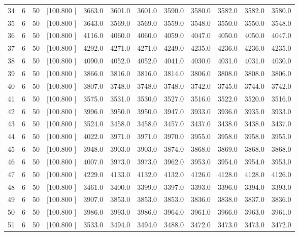 \documentclass[12pt,a4paper]{article}
\begin{document}
\begin{center}
{\begin{tabular}{r r r r r r r r r r r r}
  34&  6& 50&[100.800   ]&  3663.0&  3601.0&  3601.0&  3590.0&  3580.0&  3582.0&  3582.0&  3580.0\\[-0.02in]
  35&  6& 50&[100.800   ]&  3643.0&  3569.0&  3569.0&  3559.0&  3548.0&  3550.0&  3550.0&  3548.0\\[-0.02in]
  36&  6& 50&[100.800   ]&  4116.0&  4060.0&  4060.0&  4059.0&  4047.0&  4050.0&  4050.0&  4047.0\\[-0.02in]
  37&  6& 50&[100.800   ]&  4292.0&  4271.0&  4271.0&  4249.0&  4235.0&  4236.0&  4236.0&  4235.0\\[-0.02in]
  38&  6& 50&[100.800   ]&  4090.0&  4052.0&  4052.0&  4041.0&  4030.0&  4031.0&  4031.0&  4030.0\\[-0.02in]
  39&  6& 50&[100.800   ]&  3866.0&  3816.0&  3816.0&  3814.0&  3806.0&  3808.0&  3808.0&  3806.0\\[-0.02in]
  40&  6& 50&[100.800   ]&  3807.0&  3748.0&  3748.0&  3748.0&  3742.0&  3745.0&  3744.0&  3742.0\\[-0.02in]
  41&  6& 50&[100.800   ]&  3575.0&  3531.0&  3530.0&  3527.0&  3516.0&  3522.0&  3520.0&  3516.0\\[-0.02in]
  42&  6& 50&[100.800   ]&  3996.0&  3950.0&  3950.0&  3947.0&  3933.0&  3936.0&  3935.0&  3933.0\\[-0.02in]
  43&  6& 50&[100.800   ]&  3524.0&  3458.0&  3458.0&  3457.0&  3437.0&  3438.0&  3438.0&  3437.0\\[-0.02in]
  44&  6& 50&[100.800   ]&  4022.0&  3971.0&  3971.0&  3970.0&  3955.0&  3958.0&  3958.0&  3955.0\\[-0.02in]
  45&  6& 50&[100.800   ]&  3948.0&  3903.0&  3903.0&  3874.0&  3868.0&  3869.0&  3868.0&  3868.0\\[-0.02in]
  46&  6& 50&[100.800   ]&  4007.0&  3973.0&  3973.0&  3962.0&  3953.0&  3954.0&  3954.0&  3953.0\\[-0.02in]
  47&  6& 50&[100.800   ]&  4229.0&  4133.0&  4132.0&  4132.0&  4126.0&  4128.0&  4128.0&  4126.0\\[-0.02in]
  48&  6& 50&[100.800   ]&  3461.0&  3400.0&  3399.0&  3397.0&  3393.0&  3396.0&  3394.0&  3393.0\\[-0.02in]
  49&  6& 50&[100.800   ]&  3907.0&  3853.0&  3853.0&  3853.0&  3836.0&  3838.0&  3837.0&  3836.0\\[-0.02in]
  50&  6& 50&[100.800   ]&  3986.0&  3993.0&  3986.0&  3964.0&  3961.0&  3966.0&  3963.0&  3961.0\\[-0.02in]
  51&  6& 50&[100.800   ]&  3533.0&  3494.0&  3494.0&  3488.0&  3472.0&  3473.0&  3473.0&  3472.0\\[-0.02in]

\end{tabular}}
\end{center}
\end{document}

